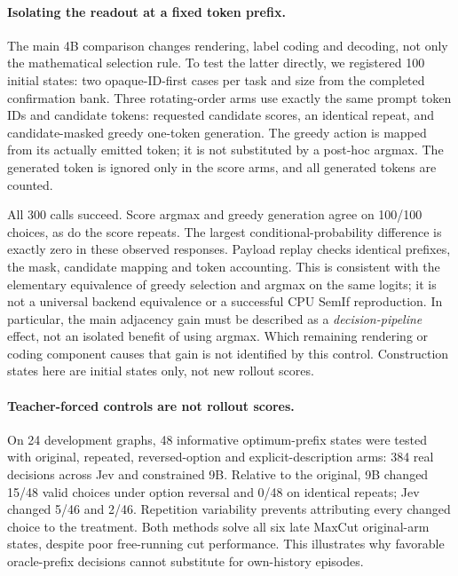 \paragraph{Isolating the readout at a fixed token prefix.}
The main 4B comparison changes rendering, label coding and decoding, not
only the mathematical selection rule. To test the latter directly, we
registered 100 initial states: two opaque-ID-first cases per task and size
from the completed confirmation bank. Three rotating-order arms use exactly
the same prompt token IDs and candidate tokens: requested candidate scores,
an identical repeat, and candidate-masked greedy one-token generation.
The greedy action is mapped from its actually emitted token; it is not
substituted by a post-hoc argmax. The generated token is ignored only in
the score arms, and all generated tokens are counted.

All 300 calls succeed. Score argmax and greedy generation agree on 100/100
choices, as do the score repeats. The largest conditional-probability
difference is exactly zero in these observed responses. Payload replay checks
identical prefixes, the mask, candidate mapping and token accounting.
This is consistent with the elementary equivalence of greedy selection and
argmax on the same logits; it is not a universal backend equivalence or a
successful CPU SemIf reproduction. In particular, the main adjacency gain
must be described as a \emph{decision-pipeline} effect, not an isolated
benefit of using argmax. Which remaining rendering or coding component causes
that gain is not identified by this control. Construction states here are
initial states only, not new rollout scores.

\paragraph{Teacher-forced controls are not rollout scores.}
On 24 development graphs, 48 informative optimum-prefix states were tested
with original, repeated, reversed-option and explicit-description arms:
384 real decisions across Jev and constrained 9B. Relative to the original,
9B changed 15/48 valid choices under option reversal and 0/48 on identical
repeats; Jev changed 5/46 and 2/46. Repetition variability prevents attributing
every changed choice to the treatment. Both methods solve all six late
MaxCut original-arm states, despite poor free-running cut performance.
This illustrates why favorable oracle-prefix decisions cannot substitute for
own-history episodes.

